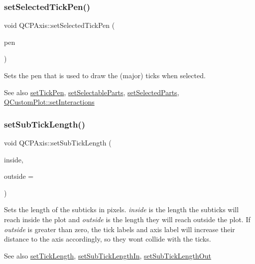 \subsubsection{\texorpdfstring{setSelectedTickPen()}{setSelectedTickPen()}}
{\footnotesize\ttfamily void Q\+C\+P\+Axis\+::set\+Selected\+Tick\+Pen (\begin{DoxyParamCaption}\item[{const Q\+Pen \&}]{pen }\end{DoxyParamCaption})}

Sets the pen that is used to draw the (major) ticks when selected.

\begin{DoxySeeAlso}{See also}
\mbox{\hyperlink{class_q_c_p_axis_ad80923bcc1c5da4c4db602c5325e797e}{set\+Tick\+Pen}}, \mbox{\hyperlink{class_q_c_p_axis_a513f9b9e326c505d9bec54880031b085}{set\+Selectable\+Parts}}, \mbox{\hyperlink{class_q_c_p_axis_ab9d7a69277dcbed9119b3c1f25ca19c3}{set\+Selected\+Parts}}, \mbox{\hyperlink{class_q_custom_plot_a5ee1e2f6ae27419deca53e75907c27e5}{Q\+Custom\+Plot\+::set\+Interactions}} 
\end{DoxySeeAlso}
\mbox{\label{class_q_c_p_axis_ab702d6fd42fc620607435339a1c2a2e1}} 
\subsubsection{\texorpdfstring{setSubTickLength()}{setSubTickLength()}}
{\footnotesize\ttfamily void Q\+C\+P\+Axis\+::set\+Sub\+Tick\+Length (\begin{DoxyParamCaption}\item[{int}]{inside,  }\item[{int}]{outside = {} }\end{DoxyParamCaption})}

Sets the length of the subticks in pixels. {\itshape inside} is the length the subticks will reach inside the plot and {\itshape outside} is the length they will reach outside the plot. If {\itshape outside} is greater than zero, the tick labels and axis label will increase their distance to the axis accordingly, so they won\textquotesingle{}t collide with the ticks.

\begin{DoxySeeAlso}{See also}
\mbox{\hyperlink{class_q_c_p_axis_a62ec40bebe3540e9c1479a8fd2be3b0d}{set\+Tick\+Length}}, \mbox{\hyperlink{class_q_c_p_axis_ac46fa2a993a9f5789540977610acf1de}{set\+Sub\+Tick\+Length\+In}}, \mbox{\hyperlink{class_q_c_p_axis_a4c6dfc3963492ed72a77724012df5f23}{set\+Sub\+Tick\+Length\+Out}} 
\end{DoxySeeAlso}
\mbox{\label{class_q_c_p_axis_ac46fa2a993a9f5789540977610acf1de}} 
